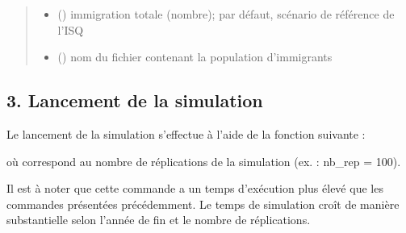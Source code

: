 \documentclass[letterpaper,10pt,french]{sphinxmanual}
\begin{document}
\begin{fulllineitems}
\begin{fulllineitems}
\begin{quote}
\begin{description}
\begin{itemize}
\item {} 
 () \textendash{} immigration totale (nombre); par défaut, scénario de référence de l’ISQ

\item {} 
 () \textendash{} nom du fichier contenant la population d’immigrants

\end{itemize}

\end{description}\end{quote}

\end{fulllineitems}


\end{fulllineitems}


\begin{DUlineblock}{0em}
\item[] 
\end{DUlineblock}


\subsection{3. Lancement de la simulation}
\label{\detokenize{utilisation:lancement-de-la-simulation}}
Le lancement de la simulation s’effectue à l’aide de la fonction suivante :

\begin{sphinxVerbatim}[commandchars=\\\{\}]
\end{sphinxVerbatim}

où  correspond au nombre de réplications de la simulation (ex. : nb\_rep = 100).

Il est à noter que cette commande a un temps d’exécution plus élevé que les commandes présentées précédemment.
Le temps de simulation croît de manière substantielle selon l’année de fin et le nombre de réplications.

\end{document}
